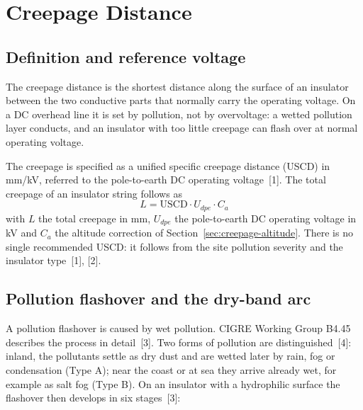 \section{Creepage Distance}
\label{sec:creepage}

\subsection{Definition and reference voltage}
\label{sec:creepage-definition}

The creepage distance is the shortest distance along the surface of an
insulator between the two conductive parts that normally carry the operating
voltage. On a DC overhead line it is set by pollution, not by overvoltage: a
wetted pollution layer conducts, and an insulator with too little creepage
can flash over at normal operating voltage.

The creepage is specified as a unified specific creepage distance (USCD) in
mm/kV, referred to the pole-to-earth DC operating voltage~[1]. The total
creepage of an insulator string follows as
\begin{equation}
  L = \mathrm{USCD} \cdot U_{dpe} \cdot C_{a}
  \label{eq:creepage}
\end{equation}
with $L$ the total creepage in mm, $U_{dpe}$ the pole-to-earth DC operating
voltage in kV and $C_{a}$ the altitude correction of
Section~\ref{sec:creepage-altitude}. There is no
single recommended USCD: it follows from the site pollution severity and the
insulator type~[1], [2].

\subsection{Pollution flashover and the dry-band arc}
\label{sec:creepage-dryband}

A pollution flashover is caused by wet pollution. CIGRE Working Group B4.45
describes the process in detail~[3]. Two forms of pollution are
distinguished~[4]: inland, the pollutants settle as dry dust and are wetted
later by rain, fog or condensation (Type A); near the coast or at sea they
arrive already wet, for example as salt fog (Type B). On an insulator with a
hydrophilic surface the flashover then develops in six stages~[3]:

